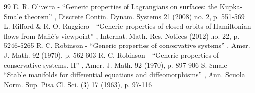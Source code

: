 \documentclass[11pt]{article}
\theoremstyle{plain}
\theoremstyle{definition}
\begin{document}
\begin{thebibliography}{99}
 E. R. Oliveira - “Generic properties of Lagrangians on surfaces: the Kupka-Smale theorem” , Discrete Contin. Dynam. Systems 21 (2008) no. 2, p. 551-569
 L. Rifford \& R. O. Ruggiero - “Generic properties of closed orbits of Hamiltonian flows from Mañé’s viewpoint” , Internat. Math. Res. Notices (2012) no. 22, p. 5246-5265
 R. C. Robinson - “Generic properties of conservative systems” , Amer. J. Math. 92 (1970), p. 562-603
 R. C. Robinson - “Generic properties of conservative systems. II” , Amer. J. Math. 92 (1970), p. 897-906
 S. Smale - “Stable manifolds for differential equations and diffeomorphisms” , Ann. Scuola Norm. Sup. Pisa Cl. Sci. (3) 17 (1963), p. 97-116
\end{thebibliography}
\end{document}
